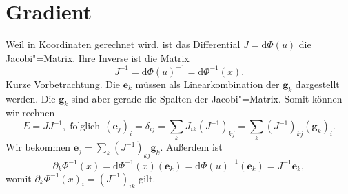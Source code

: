 \section{Gradient}

Weil in Koordinaten gerechnet wird, ist das Differential
$J=\mathrm d\Phi(u)$ die Jacobi"=Matrix. Ihre Inverse ist die Matrix
\begin{equation}
J^{-1} = \mathrm d\Phi(u)^{-1} = \mathrm d\Phi^{-1}(x).
\end{equation}
Kurze Vorbetrachtung. Die $\mathbf e_k$ müssen als Linearkombination
der $\mathbf g_k$ dargestellt werden. Die $\mathbf g_k$ sind aber
gerade die Spalten der Jacobi"=Matrix. Somit können wir rechnen
\begin{equation}
E = JJ^{-1},\;\text{folglich}\;\, (\mathbf e_j)_i = \delta_{ij}
= \sum_k J_{ik}(J^{-1})_{kj} = \sum_k (J^{-1})_{kj} (\mathbf g_k)_i.
\end{equation}
Wir bekommen $\mathbf e_j = \sum_k (J^{-1})_{kj}\mathbf g_k$.
Außerdem ist
\begin{equation}
\partial_k\Phi^{-1}(x) = \mathrm d\Phi^{-1}(x)(\mathbf e_k)
= \mathrm d\Phi(u)^{-1}(\mathbf e_k)
= J^{-1}\mathbf e_k,
\end{equation}
womit $\partial_k\Phi^{-1}(x)_i = (J^{-1})_{ik}$ gilt.

